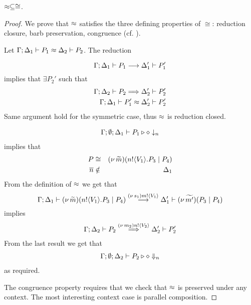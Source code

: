 
\begin{lemma}
	\label{app:lem:wbc_is_cong}
	$\approx \subseteq \cong$.
\end{lemma}


\begin{proof}
	\noi We prove that $\approx$ satisfies the three defining properties of $\cong$:
	reduction closure, barb preservation, congruence (cf. ).
%

	Let
		$\Gamma; \Delta_1 \vdash P_1 \approx \Delta_2 \vdash P_2$. The reduction

	\[
		\Gamma; \Delta_1 \vdash P_1 \stackrel{}{\longrightarrow} \Delta_1' \vdash P_1'
	\]
%
	\noi implies that 
	$\exists P_2'$ such that 
%
	\begin{eqnarray*}
		\Gamma; \Delta_2 \vdash P_2 \stackrel{}{\Longrightarrow} \Delta_2' \vdash P_2'\\
		\Gamma; \Delta_1 \vdash P_1' \approx \Delta_2' \vdash P_2'
	\end{eqnarray*}
%
	\noi Same argument hold for the symmetric case, thus $\approx$ is reduction closed.

%
	\begin{eqnarray*}
		\Gamma; \emptyset; \Delta_1 \vdash P_1 \triangleright \diamond \downarrow_{n}
	\end{eqnarray*}
%
	implies that
	\begin{eqnarray*}
		P &\cong& (\nu\, \widetilde{m})(n ! \langle V_1 \rangle . P_3 \;|\; P_4)\\
		\overline{n} &\notin& \Delta_1
	\end{eqnarray*}
%
	\noi From the definition of $\approx$ we get that
%
\[
	\Gamma; \Delta_1 \vdash (\nu\, \widetilde{m})(n ! \langle V_1 \rangle . P_3 \;|\; P_4) \stackrel{(\nu\, s_1) m ! \langle V_1 \rangle}{\longrightarrow} \Delta_1' \vdash (\nu\, \widetilde{m'})(P_3 \;|\; P_4)
\]
%
	\noi implies
%
	\begin{eqnarray*}
		\Gamma; \Delta_2 \vdash P_2 \stackrel{(\nu\, m_2) n ! \langle V_2 \rangle}{\Longrightarrow} \Delta_2' \vdash P_2'\\
	\end{eqnarray*}
%
	\noi From the last result we get that
%
	\begin{eqnarray*}
		\Gamma; \emptyset; \Delta_2 \vdash P_2 \triangleright \diamond \Downarrow_{n}
	\end{eqnarray*}
%
	\noi as required.


	\noi The congruence property requires that we check that $\approx$
	is preserved under any context.
	The most interesting context case is parallel composition.


\end{proof}

